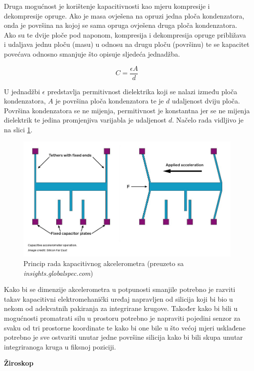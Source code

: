 \documentclass[times, utf8, diplomski]{fer}
\begin{document}
Druga mogućnost je korištenje kapacitivnosti kao mjeru kompresije i dekompresije opruge. Ako je masa ovješena na opruzi jedna ploča
kondenzatora, onda je površina na kojoj se sama opruga ovješena druga ploča kondenzatora. Ako su te dvije ploče pod naponom,
kompresija i dekompresija opruge približava i udaljava jednu ploču (masu) u odnosu na drugu ploču (površinu) te se kapacitet
povećava odnosno smanjuje što opisuje sljedeća jednadžba.

$$
C = \frac{\epsilon A}{d}
$$

U jednadžbi $\epsilon$ predstavlja permitivnost dielektrika koji se nalazi između ploča kondenzatora, $A$ je površina ploča
kondenzatora te je $d$ udaljenost dviju ploča. Površina kondenzatora se ne mijenja, permitivnost je konstantna jer se ne
mijenja dielektrik te jedina promjenjiva varijabla je udaljenost $d$. Načelo rada vidljivo je na slici \ref{accmtr}.


\begin{figure}[h!]
    \includegraphics[width=\textwidth]{Accelerometers.jpg}
    \caption{Princip rada kapacitivnog akcelerometra (preuzeto sa \textit{insights.globalspec.com})}
    \label{accmtr}
\end{figure}

Kako bi se dimenzije akcelerometra u potpunosti smanjile potrebno je razviti takav kapacitivni elektromehanički uređaj napravljen od
silicija koji bi bio u nekom od adekvatnih pakiranja za integrirane krugove. Također kako bi bili u mogućnosti promatrati silu u
prostoru potrebno je napraviti pojedini senzor za svaku od tri prostorne koordinate te kako bi one bile u što većoj mjeri usklađene
potrebno je sve ostvariti unutar jedne površine silicija kako bi bili skupa unutar integriranoga kruga u fiksnoj poziciji.

\textbf{Žiroskop}
\end{document}
